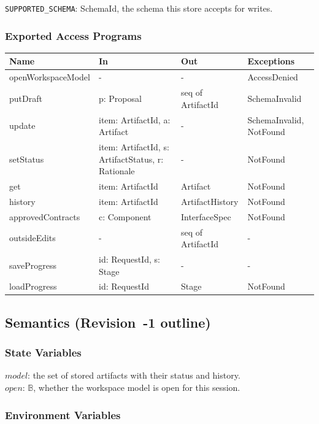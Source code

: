 \documentclass[12pt, titlepage]{article}
\begin{document}
\texttt{SUPPORTED\_SCHEMA}: SchemaId, the schema this store accepts for
writes.

\subsubsection{Exported Access Programs}

\begin{center}
\small
\begin{tabular}{>{\raggedright\arraybackslash}p{3.7cm} >{\raggedright\arraybackslash}p{3.8cm} >{\raggedright\arraybackslash}p{3.6cm} >{\raggedright\arraybackslash}p{3.7cm}}
\hline
\textbf{Name} & \textbf{In} & \textbf{Out} & \textbf{Exceptions} \\
\hline
openWorkspaceModel & - & - & AccessDenied \\
putDraft & p: Proposal & seq of ArtifactId & SchemaInvalid \\
update & item: ArtifactId, a: Artifact & - & SchemaInvalid, NotFound \\
setStatus & item: ArtifactId, s: ArtifactStatus, r: Rationale & - & NotFound \\
get & item: ArtifactId & Artifact & NotFound \\
history & item: ArtifactId & ArtifactHistory & NotFound \\
approvedContracts & c: Component & InterfaceSpec & NotFound \\
outsideEdits & - & seq of ArtifactId & - \\
saveProgress & id: RequestId, s: Stage & - & - \\
loadProgress & id: RequestId & Stage & NotFound \\
\hline
\end{tabular}
\end{center}

\subsection{Semantics (Revision~-1 outline)}

\subsubsection{State Variables}

$model$: the set of stored artifacts with their status and history.\\
$open$: $\mathbb{B}$, whether the workspace model is open for this session.

\subsubsection{Environment Variables}
\end{document}
